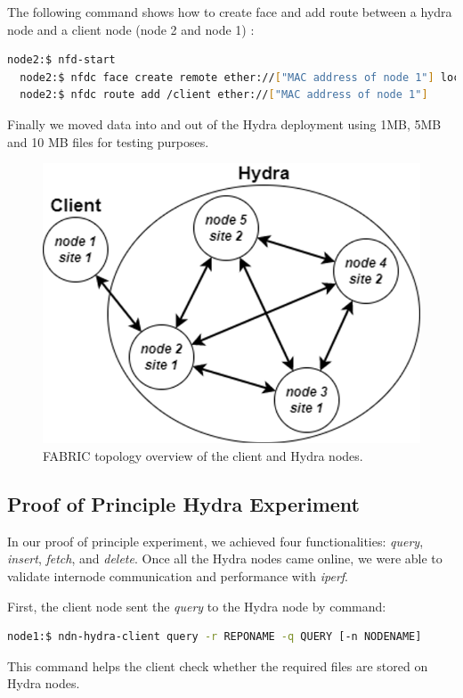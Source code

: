 \noindent The following command shows how to create face and add route between a hydra node and a client node (node 2 and node 1) :
\begin{lstlisting}[language=bash]
  node2:$ nfd-start
  node2:$ nfdc face create remote ether://["MAC address of node 1"] local dev://"Ethernet interface of node 2 with node 1"
  node2:$ nfdc route add /client ether://["MAC address of node 1"]
\end{lstlisting}

Finally we moved data into and out of the Hydra deployment using 1MB, 5MB and 10 MB files for testing purposes.

\begin{figure}[!ht]
    \centering
    \includegraphics[width=0.8\columnwidth]{visuals/nodes-on-fabric.png}
    \caption{FABRIC topology overview of the client and Hydra nodes. }
    \label{fig:nodes-interface}
\end{figure}

\subsection{Proof of Principle Hydra Experiment }
In our proof of principle experiment, we achieved four functionalities: \textit{query}, \textit{insert}, \textit{fetch}, and \textit{delete}. Once all the Hydra nodes came online, we were able to validate internode communication and performance with \textit{iperf}. 

First, the client node sent the \textit{query} to the Hydra node by command:
\begin{lstlisting}[language=bash]
  node1:$ ndn-hydra-client query -r REPONAME -q QUERY [-n NODENAME]
\end{lstlisting}

This command helps the client check whether the required files are stored on Hydra nodes. 

